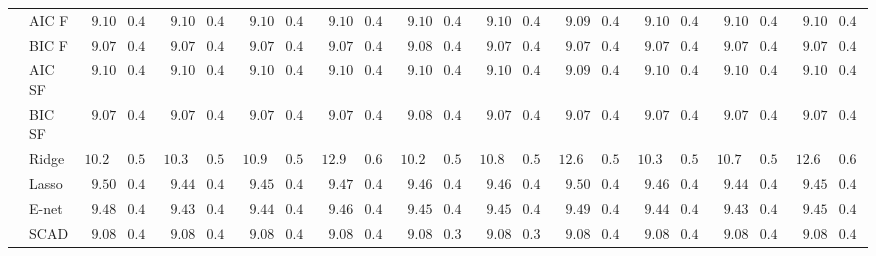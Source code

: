 \begin{tabular}{ll|ll|llllll|llllll|llllll}
	& AIC F  & $\phantom{0}9.10$ & $0.40$ & $\phantom{0}9.10$ & $0.40$ & $\phantom{0}9.10$ & $0.40$ & $\phantom{0}9.10$ & $0.40$ & $\phantom{0}9.10$ & $0.40$ & $\phantom{0}9.10$ & $0.40$ & $\phantom{0}9.09$ & $0.40$ & $\phantom{0}9.10$ & $0.40$ & $\phantom{0}9.10$ & $0.40$ & $\phantom{0}9.10$ & $0.40$ \\
	& BIC F  & $\phantom{0}9.07$ & $0.40$ & $\phantom{0}9.07$ & $0.40$ & $\phantom{0}9.07$ & $0.40$ & $\phantom{0}9.07$ & $0.40$ & $\phantom{0}9.08$ & $0.40$ & $\phantom{0}9.07$ & $0.40$ & $\phantom{0}9.07$ & $0.40$ & $\phantom{0}9.07$ & $0.40$ & $\phantom{0}9.07$ & $0.40$ & $\phantom{0}9.07$ & $0.40$ \\
	& AIC SF  & $\phantom{0}9.10$ & $0.40$ & $\phantom{0}9.10$ & $0.40$ & $\phantom{0}9.10$ & $0.40$ & $\phantom{0}9.10$ & $0.40$ & $\phantom{0}9.10$ & $0.40$ & $\phantom{0}9.10$ & $0.40$ & $\phantom{0}9.09$ & $0.40$ & $\phantom{0}9.10$ & $0.40$ & $\phantom{0}9.10$ & $0.40$ & $\phantom{0}9.10$ & $0.40$ \\
	& BIC SF  & $\phantom{0}9.07$ & $0.40$ & $\phantom{0}9.07$ & $0.40$ & $\phantom{0}9.07$ & $0.40$ & $\phantom{0}9.07$ & $0.40$ & $\phantom{0}9.08$ & $0.40$ & $\phantom{0}9.07$ & $0.40$ & $\phantom{0}9.07$ & $0.40$ & $\phantom{0}9.07$ & $0.40$ & $\phantom{0}9.07$ & $0.40$ & $\phantom{0}9.07$ & $0.40$ \\
	& Ridge  & $10.21$ & $0.50$ & $10.30$ & $0.51$ & $10.91$ & $0.59$ & $12.92$ & $0.62$ & $10.29$ & $0.55$ & $10.82$ & $0.59$ & $12.62$ & $0.56$ & $10.30$ & $0.55$ & $10.78$ & $0.59$ & $12.62$ & $0.66$ \\
	& Lasso  & $\phantom{0}9.50$ & $0.45$ & $\phantom{0}9.44$ & $0.45$ & $\phantom{0}9.45$ & $0.47$ & $\phantom{0}9.47$ & $0.44$ & $\phantom{0}9.46$ & $0.47$ & $\phantom{0}9.46$ & $0.45$ & $\phantom{0}9.50$ & $0.44$ & $\phantom{0}9.46$ & $0.47$ & $\phantom{0}9.44$ & $0.47$ & $\phantom{0}9.45$ & $0.44$ \\
	& E-net  & $\phantom{0}9.48$ & $0.44$ & $\phantom{0}9.43$ & $0.44$ & $\phantom{0}9.44$ & $0.46$ & $\phantom{0}9.46$ & $0.42$ & $\phantom{0}9.45$ & $0.45$ & $\phantom{0}9.45$ & $0.45$ & $\phantom{0}9.49$ & $0.43$ & $\phantom{0}9.44$ & $0.46$ & $\phantom{0}9.43$ & $0.46$ & $\phantom{0}9.45$ & $0.43$ \\
	& SCAD  & $\phantom{0}9.08$ & $0.40$ & $\phantom{0}9.08$ & $0.40$ & $\phantom{0}9.08$ & $0.40$ & $\phantom{0}9.08$ & $0.40$ & $\phantom{0}9.08$ & $0.39$ & $\phantom{0}9.08$ & $0.39$ & $\phantom{0}9.08$ & $0.40$ & $\phantom{0}9.08$ & $0.40$ & $\phantom{0}9.08$ & $0.40$ & $\phantom{0}9.08$ & $0.40$ \\

\end{tabular}
